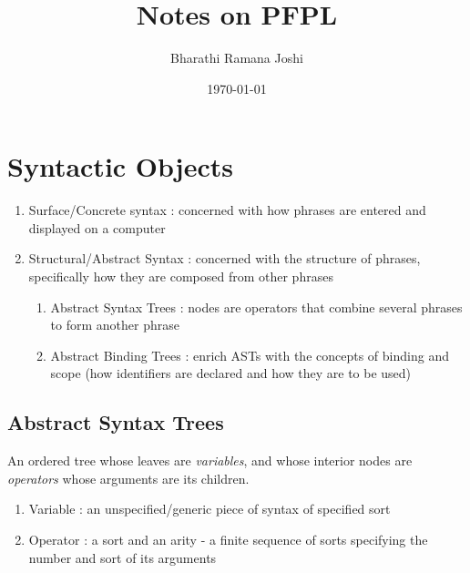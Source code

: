 \documentclass[titlepage, 12pt]{article}
\begin{document}
\title{Notes on PFPL}

\author{Bharathi Ramana Joshi}

\date{\today}

\maketitle

\tableofcontents

\newpage

\section{Syntactic Objects}

\begin{enumerate}

	\item Surface/Concrete syntax : concerned with how phrases are entered and
		displayed on a computer

	\item Structural/Abstract Syntax : concerned with the structure of phrases,
		specifically how they are composed from other phrases

		\begin{enumerate}
			
			\item Abstract Syntax Trees : nodes are operators that combine
				several phrases to form another phrase

			\item Abstract Binding Trees : enrich ASTs with the concepts of
				binding and scope (how identifiers are declared and how they are
				to be used)

		\end{enumerate}

\end{enumerate}

\subsection{Abstract Syntax Trees}

An ordered tree whose leaves are \textit{variables}, and whose interior nodes
are \textit{operators} whose arguments are its children.

\begin{enumerate}

	\item Variable : an unspecified/generic piece of syntax of specified sort

	\item Operator : a sort and an arity - a finite sequence of sorts specifying
		the number and sort of its arguments

\end{enumerate}
\end{document}
